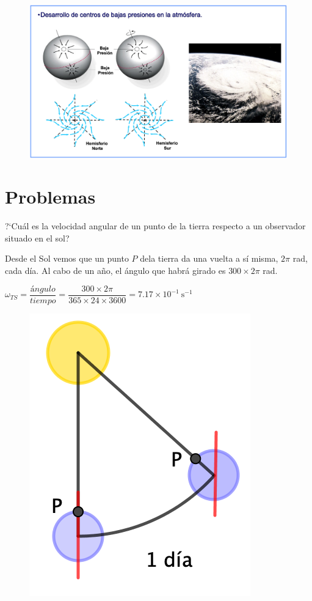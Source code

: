 \begin{figure}[H]
	\centering
	\includegraphics[width=1\textwidth]{imagenes/imagenes10/T10IM15.png}
\end{figure}

\section{Problemas}

\begin{prob}
?`Cuál es la velocidad angular de un punto de la tierra 	respecto a un observador situado en el sol?
\end{prob}

\begin{multicols}{2}
Desde el Sol vemos que un punto $P$ dela tierra da una vuelta a sí misma, $2\pi$ rad, cada día. Al cabo de un año, el ángulo que habrá girado es $300 \times 2\pi$ rad.

$\omega_{TS}=\dfrac{ángulo}{tiempo}=\dfrac{300 \times 2\pi}{365\times 24\times 3600}=7.17\times 10^{-1}\ \text{s}^{-1}$
\begin{figure}[H]
	\centering
	\includegraphics[width=.3\textwidth]{imagenes/imagenes10/T10IM16.png}
\end{figure}
\end{multicols}

